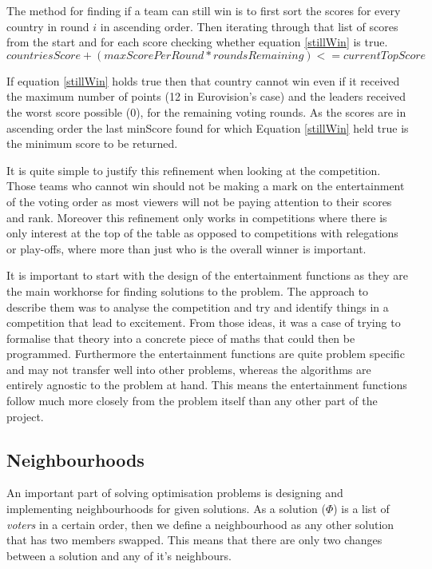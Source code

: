 \documentclass[12pt]{report}
\begin{document}
The method for finding if a team can still win is to first sort the scores for every country in round $i$ in ascending order. Then iterating through that list of scores from the start and for each score checking whether equation \ref{stillWin} is true.
\begin{equation}\label{stillWin}
	countriesScore + (maxScorePerRound * roundsRemaining) <= currentTopScore
\end{equation}

If equation \ref{stillWin} holds true then that country cannot win even if it received the maximum number of points (12 in Eurovision's case) and the leaders received the worst score possible (0), for the remaining voting rounds. As the scores are in ascending order the last minScore found for which Equation \ref{stillWin} held true is the minimum score to be returned.

It is quite simple to justify this refinement when looking at the competition. Those teams who cannot win should not be making a mark on the entertainment of the voting order as most viewers will not be paying attention to their scores and rank. Moreover this refinement only works in competitions where there is only interest at the top of the table as opposed to competitions with relegations or play-offs, where more than just who is the overall winner is important.

It is important to start with the design of the entertainment functions as they are the main workhorse for finding solutions to the problem. The approach to describe them was to analyse the competition and try and identify things in a competition that lead to excitement. From those ideas, it was a case of trying to formalise that theory into a concrete piece of maths that could then be programmed. Furthermore the entertainment functions are quite problem specific and may not transfer well into other problems, whereas the algorithms are entirely agnostic to the problem at hand. This means the entertainment functions follow much more closely from the problem itself than any other part of the project.

\subsection{Neighbourhoods}\label{Neighbours}
An important part of solving optimisation problems is designing and implementing neighbourhoods\cite{Neighbourhood} for given solutions. As a solution ($\Phi$) is a list of \textit{voters} in a certain order, then we define a neighbourhood as any other solution that has two members swapped. This means that there are only two changes between a solution and any of it's neighbours.
\end{document}
